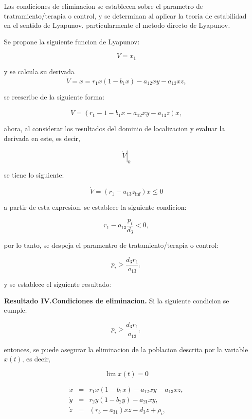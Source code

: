 \documentclass[letterpaper,11pt]{article}
\begin{document}
Las condiciones de eliminacion se establecen sobre el parametro de
tratramiento/terapia o control, y se determinan al aplicar la teoria de
estabilidad en el sentido de Lyapunov, particularmente el metodo directo de
Lyapunov.

Se propone la siguiente funcion de Lyapunov:

\begin{equation*}
V=x_{1}
\end{equation*}

y se calcula su derivada 
\begin{equation*}
\dot{V}=\dot{x}=r_{1}x(1-b_{1}x)-a_{12}xy-a_{13}xz,
\end{equation*}

se reescribe de la siguiente forma:

\begin{equation*}
\dot{V}=(r_{1}-1-b_{1}x-a_{12}xy-a_{13}z)x,
\end{equation*}

ahora, al considerar los resultados del dominio de localizacion y evaluar la
derivada en este, es decir,

\begin{equation*}
\left. \dot{V}\right\vert _{k}
\end{equation*}

se tiene lo siguiente:

\begin{equation*}
\dot{V}=(r_{1}-a_{13}z_{\inf })x\leq 0
\end{equation*}

a partir de esta expresion, se establece la siguiente condicion:

\begin{equation*}
r_{1}-a_{13}\frac{p_{i}}{d_{3}}<0,
\end{equation*}

por lo tanto, se despeja el paramentro de tratamiento/terapia o control:

\begin{equation*}
p_{i}>\frac{d_{3}r_{1}}{a_{13}},
\end{equation*}

y se establece el siguiente resultado:

\bigskip

\textbf{Resultado IV.\textbf{Condiciones de eliminacion}.} Si la siguiente
condicion se cumple:

\begin{equation*}
p_{i}>\frac{d_{3}r_{1}}{a_{13}},
\end{equation*}

entonces, se puede asegurar la eliminacion de la poblacion descrita por la
variable $x(t)$, es decir,

\begin{equation*}
\lim x(t)=0
\end{equation*}

\begin{eqnarray*}
\dot{x} &=&r_{1}x(1-b_{1}x)-a_{12}xy-a_{13}xz, \\
\dot{y} &=&r_{2}y(1-b_{2}y)-a_{21}xy, \\
\dot{z} &=&(r_{3}-a_{31})xz-d_{3}z+\rho _{i},
\end{eqnarray*}
\end{document}
